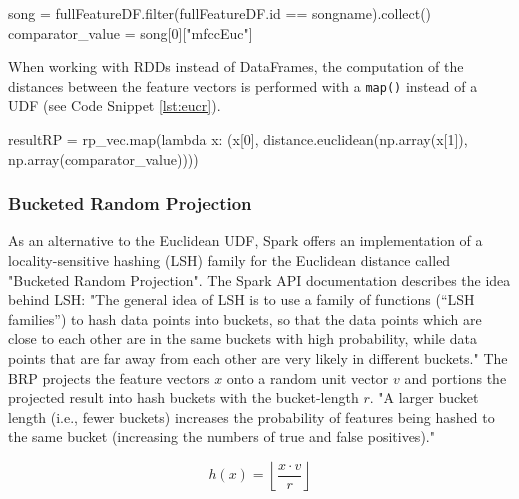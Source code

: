 \begin{pythonCode}[frame=single,label={lst:comp},caption={Filter for requested song},captionpos=b]
song = fullFeatureDF.filter(fullFeatureDF.id == songname).collect()
comparator_value = song[0]["mfccEuc"]
\end{pythonCode}

\noindent When working with RDDs instead of DataFrames, the computation of the distances between the feature vectors is performed with a \lstinline{map()} instead of a UDF (see Code Snippet \ref{lst:eucr}). 

\begin{pythonCode}[frame=single,label={lst:eucr},caption={euclidean distance RDD},captionpos=b]
resultRP = rp_vec.map(lambda x: (x[0], distance.euclidean(np.array(x[1]), np.array(comparator_value))))
\end{pythonCode}

\subsubsection{Bucketed Random Projection}

As an alternative to the Euclidean UDF, Spark offers an implementation of a locality-sensitive hashing (LSH) family for the Euclidean distance called "Bucketed Random Projection". The Spark API documentation describes the idea behind LSH: "The general idea of LSH is to use a family of functions (“LSH families”) to hash data points into buckets, so that the data points which are close to each other are in the same buckets with high probability, while data points that are far away from each other are very likely in different buckets." \cite{lshspark} The BRP projects the feature vectors $x$ onto a random unit vector $v$ and portions the projected result into hash buckets with the bucket-length $r$. "A larger bucket length (i.e., fewer buckets) increases the probability of features being hashed to the same bucket (increasing the numbers of true and false positives)." \cite{lshspark}

\begin{equation} \label{eq:brp}
h(x) = \left \lfloor{\frac{x \cdot v}{r}}\right \rfloor 
\end{equation}

